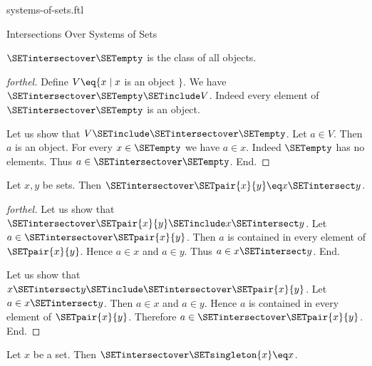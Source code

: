 \documentclass{naproche-library}
\begin{document}
\begin{smodule}[title=Systems of Sets]{systems-of-sets.ftl}
\begin{sfragment}{Intersections Over Systems of Sets}
  \begin{proposition}[forthel,id=FOUNDATIONS_10_2809770322952192]
    $\SETintersectover \SETempty$ is the class of all objects.
  \end{proposition}
  \begin{proof}[forthel]
    Define $V \eq \{ x \mid x$ is an object $\}$.
    We have $\SETintersectover \SETempty \SETinclude V$.
    Indeed every element of $\SETintersectover \SETempty$ is an object.

    Let us show that $V \SETinclude \SETintersectover \SETempty$.
      Let $a \in V$.
      Then $a$ is an object.
      For every $x \in \SETempty$ we have $a \in x$.
      Indeed $\SETempty$ has no elements.
      Thus $a \in \SETintersectover \SETempty$.
    End.
  \end{proof}

  \begin{proposition}[forthel,id=FOUNDATIONS_10_7851827447988224]
    Let $x, y$ be sets.
    Then $\SETintersectover \SETpair{x}{y} \eq x \SETintersect y$.
  \end{proposition}
  \begin{proof}[forthel]
    Let us show that $\SETintersectover \SETpair{x}{y} \SETinclude x \SETintersect y$.
      Let $a \in \SETintersectover \SETpair{x}{y}$.
      Then $a$ is contained in every element of $\SETpair{x}{y}$.
      Hence $a \in x$ and $a \in y$.
      Thus $a \in x \SETintersect y$.
    End.

    Let us show that $x \SETintersect y \SETinclude \SETintersectover \SETpair{x}{y}$.
      Let $a \in x \SETintersect y$.
      Then $a \in x$ and $a \in y$.
      Hence $a$ is contained in every element of $\SETpair{x}{y}$.
      Therefore $a \in \SETintersectover \SETpair{x}{y}$.
    End.
  \end{proof}

  \begin{corollary}[forthel,id=FOUNDATIONS_10_7239895674257408]
    Let $x$ be a set.
    Then $\SETintersectover \SETsingleton{x} \eq x$.
  \end{corollary}
\end{sfragment}
\end{smodule}
\end{document}
